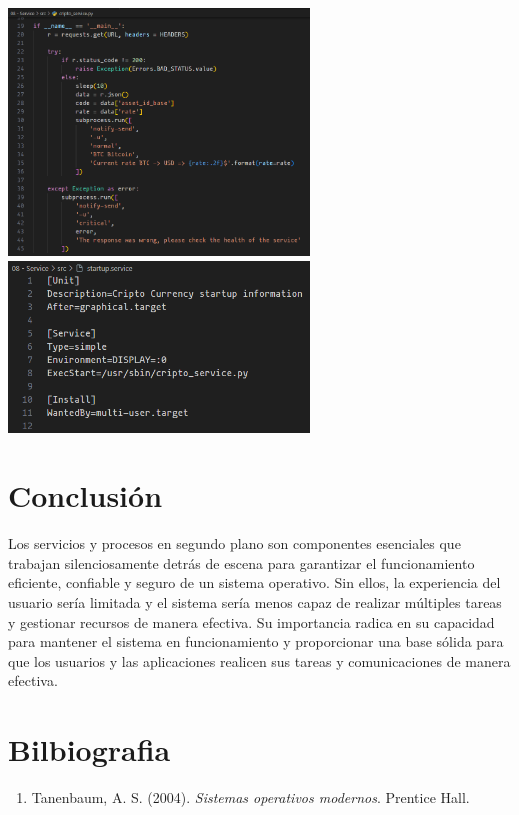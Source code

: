 \documentclass{dense_template}
\begin{document}
 \begin{center}
    \includegraphics[width=0.6\textwidth]{notifications.png}
    \vspace{1cm}
    \includegraphics[width=0.6\textwidth]{systemd-service.png}
 \end{center}
\pagebreak
\section{Conclusión}

 Los servicios y procesos en segundo plano son componentes esenciales que trabajan silenciosamente detrás de escena para garantizar el funcionamiento eficiente, confiable y seguro de un sistema operativo. Sin ellos, la experiencia del usuario sería limitada y el sistema sería menos capaz de realizar múltiples tareas y gestionar recursos de manera  efectiva. Su importancia radica en su capacidad para mantener el sistema en funcionamiento y proporcionar una base sólida para que los usuarios y las aplicaciones realicen sus tareas y comunicaciones de manera efectiva.


\pagebreak
\section{Bilbiografia}
\sloppy
\begin{enumerate}
    \item Tanenbaum, A. S. (2004). \textit{Sistemas operativos modernos}. Prentice Hall.
\end{enumerate}
\end{document}
